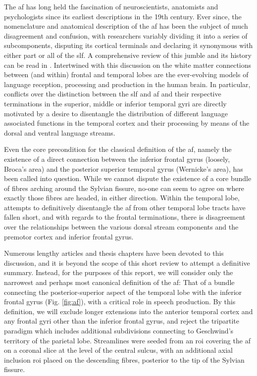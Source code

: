 The \gls{af} has long held the fascination of neuroscientists, anatomists and psychologists since its earliest descriptions in the 19th century.\autocite{Burdach1822}
Ever since, the nomenclature and anatomical description of the \gls{af} has been the subject of much disagreement and confusion, with researchers variably dividing it into a series of subcomponents, disputing its cortical terminals and declaring it synonymous with either part or all of the \gls{slf}.
A comprehensive review of this jumble and its history can be read in \textcite{PortodeOliveira2021}.
Intertwined with this discussion on the white matter connections between (and within) frontal and temporal lobes are the ever-evolving models of language reception, processing and production in the human brain.\autocite{Becker2022a}
In particular, conflicts over the distinction between the \gls{slf} and \gls{af} and their respective terminations in the superior, middle or inferior temporal gyri are directly motivated by a desire to disentangle the distribution of different language associated functions in the temporal cortex and their processing by means of the dorsal and ventral language streams.\autocite{Hickok2004,Friederici2013a,Kljajevic2014a,Giampiccolo2022a,Becker2022a}

Even the core precondition for the classical definition of the \gls{af}, namely the existence of a direct connection between the inferior frontal gyrus (loosely, Broca's area) and the posterior superior temporal gyrus (Wernicke's area), has been called into question.\autocite{Dick2012,Giampiccolo2022a}
While we cannot dispute the existence of a core bundle of fibres arching around the Sylvian fissure, no-one can seem to agree on where exactly those fibres are headed, in either direction.
Within the temporal lobe, attempts to definitively disentangle the \gls{af} from other temporal lobe tracts have fallen short,\autocite{Becker2022} and with regards to the frontal terminations, there is disagreement over the relationships between the various dorsal stream components and the premotor cortex and inferior frontal gyrus.\autocite{Kljajevic2014a,Giampiccolo2022a}

Numerous lengthy articles and thesis chapters have been devoted to this discussion, and it is beyond the scope of this short review to attempt a definitive summary.
Instead, for the purposes of this report, we will consider only the narrowest and perhaps most canonical definition of the \gls{af}:
That of a bundle connecting the posterior-superior aspect of the temporal lobe with the inferior frontal gyrus (Fig. \ref{fig:af}), with a critical role in speech production.\autocite{Baldo2015}
By this definition, we will exclude longer extensions into the anterior temporal cortex\autocite{Giampiccolo2022a} and any frontal gyri other than the inferior frontal gyrus, and reject the tripartite paradigm which includes additional subdivisions connecting to Geschwind's territory of the parietal lobe.\autocite{Catani2005,Martino2013a}
Streamlines were seeded from an \gls{roi} covering the \gls{af} on a coronal slice at the level of the central sulcus, with an additional axial inclusion \gls{roi} placed on the descending fibres, posterior to the tip of the Sylvian fissure.



